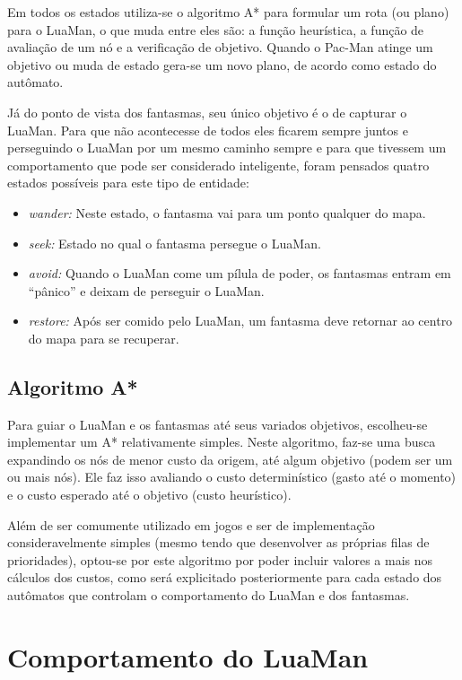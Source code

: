 \documentclass[a4paper]{scrartcl}
\begin{document}
Em todos os estados utiliza-se o algoritmo A* para formular um rota (ou plano) para o LuaMan,
o que muda entre eles são: a função heurística, a função de avaliação de um nó e a verificação
de objetivo. Quando o Pac-Man atinge um objetivo ou muda de estado gera-se um novo plano, de acordo como estado do autômato.

Já do ponto de vista dos fantasmas, seu único objetivo é o de capturar o LuaMan. Para que não acontecesse de todos eles ficarem sempre juntos
e perseguindo o LuaMan por um mesmo caminho sempre e para que tivessem um comportamento que pode ser considerado inteligente,
foram pensados quatro estados possíveis para este tipo de entidade:

\begin{itemize}
	\item \textit{wander:} Neste estado, o fantasma vai para um ponto qualquer do mapa.
	\item \textit{seek:} Estado no qual o fantasma persegue o LuaMan.
	\item \textit{avoid:} Quando o LuaMan come um pílula de poder, os fantasmas entram em ``pânico'' e deixam de perseguir o LuaMan.
	\item \textit{restore:} Após ser comido pelo LuaMan, um fantasma deve retornar ao centro do mapa para se recuperar.
\end{itemize}

\subsection{Algoritmo A*}

Para guiar o LuaMan e os fantasmas até seus variados objetivos, escolheu-se implementar um A* relativamente simples. Neste algoritmo, faz-se uma busca expandindo os nós de menor custo da origem, até algum
objetivo (podem ser um ou mais nós). Ele faz isso avaliando o custo determinístico (gasto até o momento) e o custo esperado até o objetivo (custo heurístico).

Além de ser comumente utilizado em jogos e ser  de implementação consideravelmente simples
(mesmo tendo que desenvolver as próprias filas de prioridades), optou-se por este algoritmo por
poder incluir valores a mais nos cálculos dos custos, como será explicitado posteriormente para
cada estado dos autômatos que controlam o comportamento do LuaMan e dos fantasmas.

\section{Comportamento do LuaMan}
\end{document}
